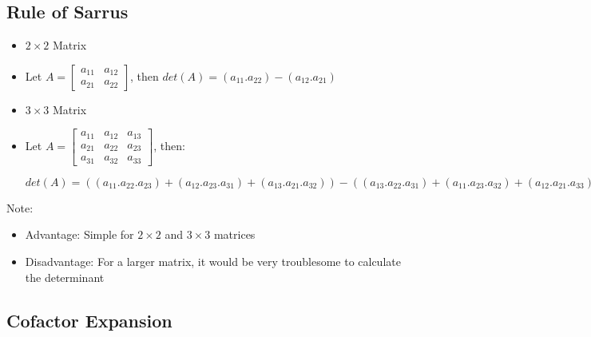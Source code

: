 \documentclass[a4paper,12pt]{article}
\begin{document}
\subsection*{Rule of Sarrus}
\begin{itemize}
  \item \(2\times 2\) Matrix
  \item[] Let \(A=\begin{bmatrix}
      a_{11} & a_{12} \\ a_{21} & a_{22}
    \end{bmatrix}\), then \(det(A)=(a_{11}.a_{22})-(a_{12}.a_{21})\)
  \item \(3\times 3\) Matrix
  \item Let \(A=\begin{bmatrix}
          a_{11} & a_{12} & a_{13} \\ a_{21} & a_{22} & a_{23} \\ a_{31} & a_{32} & a_{33}
        \end{bmatrix}\), then:
        \begin{center}
          \(det(A)=((a_{11}.a_{22}.a_{23})+(a_{12}.a_{23}.a_{31})+(a_{13}.a_{21}.a_{32}))-((a_{13}.a_{22}.a_{31})+(a_{11}.a_{23}.a_{32})+(a_{12}.a_{21}.a_{33}))\)
        \end{center}
\end{itemize}
Note:
\begin{itemize}
  \item Advantage: Simple for \(2\times 2\) and \(3\times 3\) matrices
  \item Disadvantage: For a larger matrix, it would be very troublesome to calculate the determinant
\end{itemize}

\subsection*{Cofactor Expansion}
\end{document}
